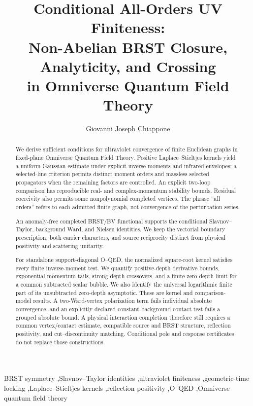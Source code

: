 \documentclass[final,5p,times,twocolumn,numbers,nopreprintline]{elsarticle}
\numberwithin{equation}{section}
\theoremstyle{definition}
\theoremstyle{remark}
\begin{document}
\begin{frontmatter}
\title{Conditional All-Orders UV Finiteness:\\
Non-Abelian BRST Closure, Analyticity, and Crossing\\
in Omniverse Quantum Field Theory}
\author[aff1]{Giovanni Joseph Chiappone}
\address[aff1]{Independent researcher}
\begin{abstract}
We derive sufficient conditions for ultraviolet convergence of
finite Euclidean graphs in fixed-plane Omniverse Quantum Field Theory.
Positive Laplace--Stieltjes kernels yield a uniform Gaussian estimate
under explicit inverse moments and infrared envelopes; a selected-line
criterion permits distinct moment orders and massless selected
propagators when the remaining factors are controlled. An explicit two-loop comparison has
reproducible real- and complex-momentum stability bounds. Residual
coercivity also permits some nonpolynomial completed vertices.
The phrase ``all orders'' refers to each admitted finite graph, not
convergence of the perturbation series.

An anomaly-free completed BRST/BV functional supports the conditional
Slavnov--Taylor, background Ward, and Nielsen identities. We keep the
vectorial boundary prescription, both carrier characters, and source
reciprocity distinct from physical positivity and scattering unitarity.

For standalone support-diagonal O--QED, the normalized square-root
kernel satisfies every finite inverse-moment test. We quantify
positive-depth derivative bounds, exponential momentum tails,
strong-depth crossovers, and a finite zero-depth limit for a common
subtracted scalar bubble. We also identify the universal logarithmic
finite part of its unsubtracted zero-depth asymptotic. These are
kernel and comparison-model results. A two-Ward-vertex polarization
term fails individual absolute convergence, and an explicitly declared
constant-background contact test fails a grouped absolute bound.
A physical interaction completion therefore still requires a common
vertex/contact estimate, compatible source and BRST structure,
reflection positivity, and cut--discontinuity matching. Conditional
pole and response certificates do not replace those constructions.
\end{abstract}
\begin{keyword}
BRST symmetry \sep Slavnov--Taylor identities \sep ultraviolet finiteness
\sep geometric-time locking \sep Laplace--Stieltjes kernels
\sep reflection positivity \sep O--QED \sep Omniverse quantum field theory
\end{keyword}
\end{frontmatter}
\end{document}
